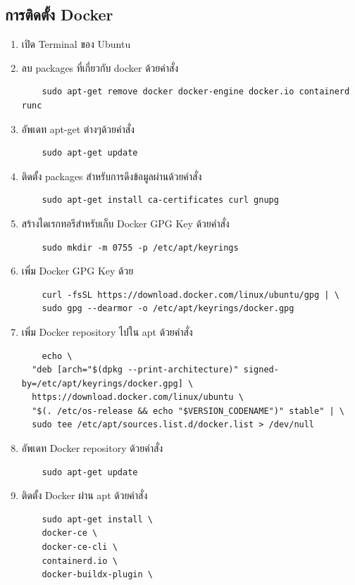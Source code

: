 \subsection{การติดตั้ง Docker}
\begin{enumerate}
  \item เปิด Terminal ของ Ubuntu
  \item ลบ packages ที่เกี่ยวกับ docker ด้วยคำสั่ง 
  \begin{verbatim}
    sudo apt-get remove docker docker-engine docker.io containerd runc
  \end{verbatim}
  \item อัพเดท apt-get ต่างๆด้วยคำสั่ง 
  \begin{verbatim}
    sudo apt-get update
  \end{verbatim}
  \item ติดตั้ง packages สำหรับการดึงข้อมูลผ่านด้วยคำสั่ง 
  \begin{verbatim}
    sudo apt-get install ca-certificates curl gnupg
  \end{verbatim}
  \item สร้างไดเรกทอรีสำหรับเก็บ Docker GPG Key ด้วยคำสั่ง 
  \begin{verbatim}
    sudo mkdir -m 0755 -p /etc/apt/keyrings
  \end{verbatim}
  \item เพิ่ม Docker GPG Key ด้วย 
  \begin{verbatim}
    curl -fsSL https://download.docker.com/linux/ubuntu/gpg | \
    sudo gpg --dearmor -o /etc/apt/keyrings/docker.gpg
  \end{verbatim}
  \item เพิ่ม Docker repository ไปใน apt ด้วยคำสั่ง 
  \begin{verbatim}
    echo \
  "deb [arch="$(dpkg --print-architecture)" signed-by=/etc/apt/keyrings/docker.gpg] \
  https://download.docker.com/linux/ubuntu \
  "$(. /etc/os-release && echo "$VERSION_CODENAME")" stable" | \
  sudo tee /etc/apt/sources.list.d/docker.list > /dev/null
  \end{verbatim}
  \item อัพเดท Docker repository ด้วยคำสั่ง 
  \begin{verbatim}
    sudo apt-get update
  \end{verbatim}
  \item ติดตั้ง Docker ผ่าน apt ด้วยคำสั่ง 
  \begin{verbatim}
    sudo apt-get install \
    docker-ce \
    docker-ce-cli \
    containerd.io \
    docker-buildx-plugin \

\end{verbatim}
\end{enumerate}
